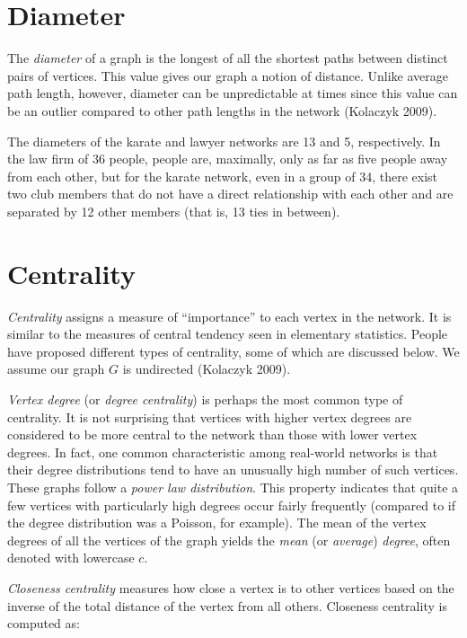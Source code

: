 \documentclass[12pt,twoside]{amherstthesis}
\begin{document}
  \section{Diameter}\label{diameter}
  
  The \emph{diameter} of a graph is the longest of all the shortest paths
  between distinct pairs of vertices. This value gives our graph a notion
  of distance. Unlike average path length, however, diameter can be
  unpredictable at times since this value can be an outlier compared to
  other path lengths in the network (Kolaczyk 2009).
  
  The diameters of the karate and lawyer networks are 13 and 5,
  respectively. In the law firm of 36 people, people are, maximally, only
  as far as five people away from each other, but for the karate network,
  even in a group of 34, there exist two club members that do not have a
  direct relationship with each other and are separated by 12 other
  members (that is, 13 ties in between).
  
  \section{Centrality}\label{centrality}
  
  \emph{Centrality} assigns a measure of ``importance'' to each vertex in
  the network. It is similar to the measures of central tendency seen in
  elementary statistics. People have proposed different types of
  centrality, some of which are discussed below. We assume our graph \(G\)
  is undirected (Kolaczyk 2009).
  
  \emph{Vertex degree} (or \emph{degree centrality}) is perhaps the most
  common type of centrality. It is not surprising that vertices with
  higher vertex degrees are considered to be more central to the network
  than those with lower vertex degrees. In fact, one common characteristic
  among real-world networks is that their degree distributions tend to
  have an unusually high number of such vertices. These graphs follow a
  \emph{power law distribution}. This property indicates that quite a few
  vertices with particularly high degrees occur fairly frequently
  (compared to if the degree distribution was a Poisson, for example). The
  mean of the vertex degrees of all the vertices of the graph yields the
  \emph{mean} (or \emph{average}) \emph{degree}, often denoted with
  lowercase \(c\).
  
  \emph{Closeness centrality} measures how close a vertex is to other
  vertices based on the inverse of the total distance of the vertex from
  all others. Closeness centrality is computed as:
  
\end{document}
